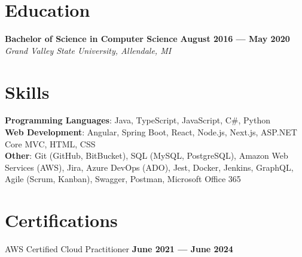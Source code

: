 \documentclass{article}
\begin{document}
\section*{Education}
\textbf{Bachelor of Science in Computer Science} \hfill \textbf{August 2016 --- May 2020}\\
\textit{Grand Valley State University, Allendale, MI}
\section*{Skills}
\textbf{Programming Languages}: Java, TypeScript, JavaScript, C\#, Python \\
\textbf{Web Development}: Angular, Spring Boot, React, Node.js, Next.js, ASP.NET Core MVC, HTML, CSS\\
\textbf{Other}: Git (GitHub, BitBucket), SQL (MySQL, PostgreSQL), Amazon Web Services (AWS), Jira, Azure DevOps (ADO), Jest, Docker, Jenkins, GraphQL, Agile (Scrum, Kanban), Swagger, Postman, Microsoft Office 365

\section*{Certifications}
AWS Certified Cloud Practitioner \hfill \textbf{June 2021 --- June 2024}
\end{document}
